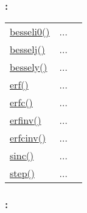 \subsubsection*{: }

\textcolor{blue}{}\begin{tabular}{>{\raggedleft}p{3cm}>{\centering}p{0.5cm}l}
\textcolor{blue}{\hyperlink{besseli0}{besseli0()}}&
...&
 \begin{NoHyper} \nameref{par:Modified-Bessel-function} \end{NoHyper}\tabularnewline
\textcolor{blue}{\hyperlink{besselj}{besselj()}}&
...&
 \begin{NoHyper} \nameref{par:Bessel-function} \end{NoHyper}\tabularnewline
\textcolor{blue}{\hyperlink{bessely}{bessely()}}&
...&
 \begin{NoHyper} \nameref{par:Bessel2-function} \end{NoHyper}\tabularnewline
\textcolor{blue}{\hyperlink{erf}{erf()}}&
...&
 \begin{NoHyper} \nameref{par:Error-function} \end{NoHyper}\tabularnewline
\textcolor{blue}{\hyperlink{erfc}{erfc()}}&
...&
 \begin{NoHyper} \nameref{par:Complementary-error-function} \end{NoHyper}\tabularnewline
\textcolor{blue}{\hyperlink{erfinv}{erfinv()}}&
...&
 \begin{NoHyper} \nameref{par:Inverse-error-function} \end{NoHyper}\tabularnewline
\textcolor{blue}{\hyperlink{erfcinv}{erfcinv()}}&
...&
 \begin{NoHyper} \nameref{par:Inverse-complementary-error} \end{NoHyper}\tabularnewline
\textcolor{blue}{\hyperlink{sinc}{sinc()}}&
...&
 \begin{NoHyper} \nameref{par:Sinc-function} \end{NoHyper}\tabularnewline
\textcolor{blue}{\hyperlink{step}{step()}}&
...&
 \begin{NoHyper} \nameref{par:Step-function} \end{NoHyper}\tabularnewline
\end{tabular}


\subsubsection*{: }

